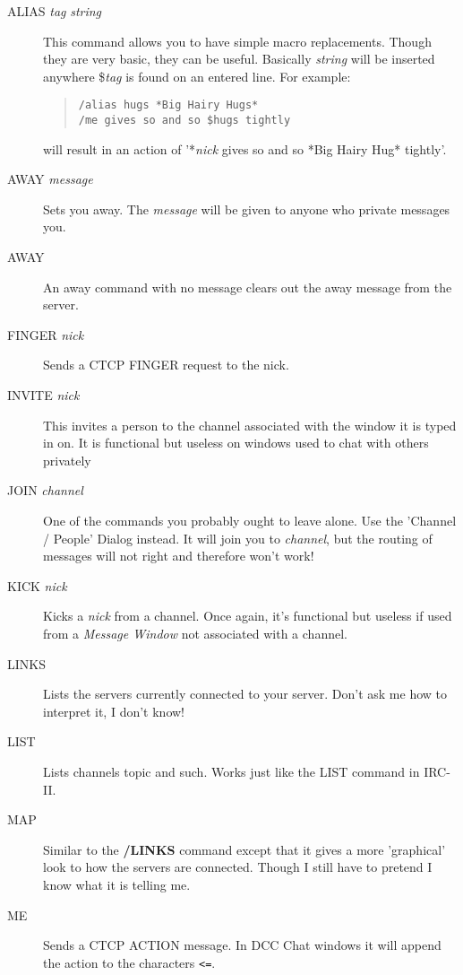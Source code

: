 \documentclass[titlepage]{article}
\begin{document}
\begin{description}
\item[ALIAS \textit{tag} \textit{string}]
   This  command  allows you to have simple macro replacements. Though
   they  are very basic, they can be useful. Basically \textit{string} will
   be  inserted  anywhere  \$\textit{tag} is  found  on  an entered
   line. For example:
\begin{quote}
\begin{verbatim}
/alias hugs *Big Hairy Hugs*
/me gives so and so $hugs tightly
\end{verbatim}
\end{quote}
   will result in an action of '*\textit{nick} gives so and so *Big Hairy Hug*
   tightly'.
\item[AWAY \textit{message}]
   Sets  you  away.  The \textit{message} will be given to anyone who private
   messages you.
\item[AWAY] 
   An away command with no message clears out the away message 
   from the server.
\item[FINGER \textit{nick}]
   Sends a CTCP FINGER request to the nick.
\item[INVITE \textit{nick}]
   This invites a person to the channel associated with the window it is
   typed  in  on. It is functional but useless on windows used to chat
   with others privately
\item[JOIN \textit{channel}]
   One  of  the  commands  you  probably ought to leave alone. Use the
   'Channel  /  People' Dialog instead. It will join you to
   \textit{channel},
   but  the  routing  of  messages  will not right and therefore won't
   work!
\item[KICK \textit{nick}]
   Kicks  a  \textit{nick} from  a  channel. Once again, it's functional but
   useless if used from a \textit{Message Window} not associated with a 
   channel.
\item[LINKS]
   Lists the servers currently connected to your server. Don't ask me
   how to interpret it, I don't know!
\item[LIST]
   Lists  channels topic and such. Works just like the LIST command in
   IRC-II.
\item[MAP]
   Similar to the \textbf{/LINKS} command except that it gives a more
   'graphical' look to how the servers are connected. Though I still
   have to pretend I know what it is telling me.
\item[ME]
   Sends a CTCP ACTION message. In DCC Chat windows it will append the
   action to the characters \texttt{<=}.

\end{description}
\end{document}
